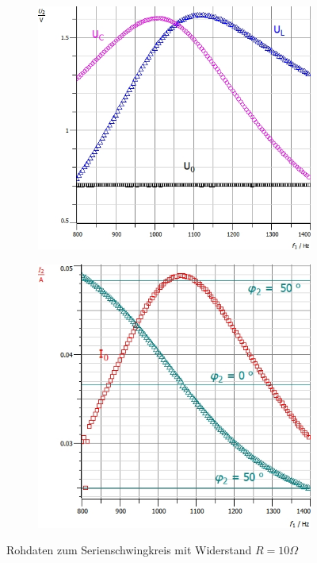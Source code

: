 \documentclass[12pt,a4paper]{article}
\begin{document}
\begin{figure}[H]
	\centering
	\begin{subfigure}{0.49\textwidth}
		\centering
		\includegraphics[width=\textwidth]{Daten/S10_Rohdaten_U.jpg}
	\end{subfigure}
	\begin{subfigure}{0.49\textwidth}
		\centering
		\includegraphics[width=\textwidth]{Daten/S10_Rohdaten_I.jpg}
	\end{subfigure}
	\caption{Rohdaten zum Serienschwingkreis mit Widerstand $R=10\Omega$}
	\label{Rohdaten_S10}
\end{figure}
\end{document}
